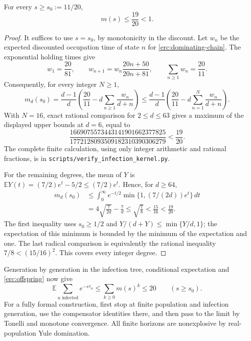 \begin{lemma}
\label{erc:certificate}
For every $s\ge s_0:=11/20$,
\begin{equation}\label{erc:subcritical-mass}
 m(s)\le\frac{19}{20}<1.
\end{equation}
\end{lemma}
\begin{proof}
It suffices to use $s=s_0$, by monotonicity in the discount.
Let $w_n$ be the expected discounted occupation time of state $n$ for
\eqref{erc:dominating-chain}.  The exponential holding times give
\[
 w_1=\frac{20}{81},\qquad
 w_{n+1}=w_n\frac{20n+50}{20n+81},\qquad
 \sum_{n\ge1}w_n=\frac{20}{11}.
\]
Consequently, for every integer $N\ge1$,
\begin{equation}\label{erc:rational-upper}
 m_d(s_0)
 =\frac{d-1}{d}\left(\frac{20}{11}
                  -d\sum_{n\ge1}\frac{w_n}{d+n}\right)
 \le\frac{d-1}{d}\left(\frac{20}{11}
                  -d\sum_{n=1}^N\frac{w_n}{d+n}\right).
\end{equation}
With $N=16$, exact rational comparison for $2\le d\le63$ gives a
maximum of the displayed upper bounds at $d=6$, equal to
\[
 \frac{1669075573443141901662377825}
      {1772128093509182310390306279}
 <\frac{19}{20}.
\]
The complete finite calculation, using only integer arithmetic and
rational fractions, is in \texttt{scripts/verify\_infection\_kernel.py}.

For the remaining degrees, the mean of $Y$ is
$\mathbb EY(t)=(7/2)e^t-5/2\le(7/2)e^t$.  Hence, for $d\ge64$,
\begin{align*}
 m_d(s_0)
 &\le\int_0^\infty e^{-t/2}
            \min\{1,(7/(2d))e^t\}\,dt\\
 &=4\sqrt{\frac7{2d}}-\frac7d
 \le\sqrt{\frac78}<\frac{15}{16}<\frac{19}{20}.
\end{align*}
The first inequality uses $s_0\ge1/2$ and
$Y/(d+Y)\le\min\{Y/d,1\}$; the expectation of this minimum is
bounded by the minimum of the expectation and one.  The last radical
comparison is equivalently the rational inequality
$7/8<(15/16)^2$.  This covers every integer degree.
\end{proof}

Generation by generation in the infection tree, conditional expectation
and \eqref{erc:offspring} now give
\begin{equation}\label{erc:total-infections}
 \mathbb E\sum_{u\text{ infected}}e^{-s\tau_u}
 \le\sum_{k\ge0}m(s)^k\le20
 \qquad(s\ge s_0).
\end{equation}
For a fully formal construction, first stop at finite population and
infection generation, use the compensator identities there, and then
pass to the limit by Tonelli and monotone convergence.  All finite
horizons are nonexplosive by real-population Yule domination.

